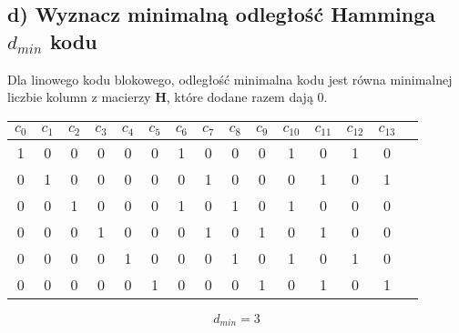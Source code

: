 \documentclass[12pt]{article}
\begin{document}
    \subsection*{d) Wyznacz minimalną odległość Hamminga $d_{min}$ kodu}

    Dla linowego kodu blokowego, odległość minimalna kodu jest równa minimalnej liczbie kolumn z macierzy $\mathbf{H}$,
    które dodane razem dają $0$. 

    \begin{table}[h]
        \centering
        \begin{tabular}{ccccccccccccccc}
            $c_0$ &  $c_1$ & $c_2$ & $c_3$ &  $c_4$ & $c_5$ & $c_6$ & $c_7$ & $c_8$ & $c_9$ &$c_{10}$ & $c_{11}$ & $c_{12}$ & $c_{13}$  \\ \hline
            1     &    0   & 0     & 0     & 0      & 0     & 1     & 0     & 0     & 0     & 1      & 0      & 1      & 0       \\
            0     &    1   & 0     & 0     & 0      & 0     & 0     & 1     & 0     & 0     & 0      & 1      & 0      & 1       \\
            0     &    0   & 1     & 0     & 0      & 0     & 1     & 0     & 1     & 0     & 1      & 0      & 0      & 0       \\
            0     &    0   & 0     & 1     & 0      & 0     & 0     & 1     & 0     & 1     & 0      & 1      & 0      & 0       \\
            0     &    0   & 0     & 0     & 1      & 0     & 0     & 0     & 1     & 0     & 1      & 0      & 1      & 0       \\
            0     &    0   & 0     & 0     & 0      & 1     & 0     & 0     & 0     & 1     & 0      & 1      & 0      & 1       \\
        \end{tabular}
    \end{table}

    $$d_{min}=3 $$







    
\end{document}
